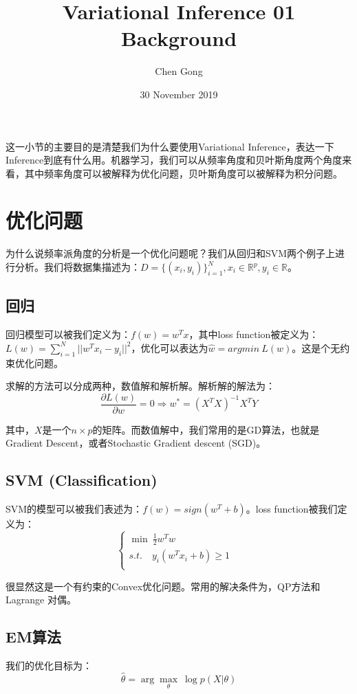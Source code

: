 \documentclass[a4paper]{article}
\title{Variational Inference 01 Background}
\author{Chen Gong}
\date{30 November 2019}
\begin{document}
\maketitle

这一小节的主要目的是清楚我们为什么要使用Variational Inference，表达一下Inference到底有什么用。机器学习，我们可以从频率角度和贝叶斯角度两个角度来看，其中频率角度可以被解释为优化问题，贝叶斯角度可以被解释为积分问题。

\section{优化问题}
为什么说频率派角度的分析是一个优化问题呢？我们从回归和SVM两个例子上进行分析。我们将数据集描述为：$D = \{ (x_i,y_i) \}_{i=1}^N,x_i \in \mathbb{R}^p,y_i \in \mathbb{R}$。
\subsection{回归}
回归模型可以被我们定义为：$f(w) = w^Tx$，其中loss function被定义为：$L(w) = \sum_{i=1}^N || w^Tx_i - y_i ||^2$，优化可以表达为$\hat{w} = argmin\ L(w)$。这是个无约束优化问题。

求解的方法可以分成两种，数值解和解析解。解析解的解法为：
\begin{equation}
    \frac{\partial L(w)}{\partial w} = 0 \Rightarrow w^{\ast} = (X^TX)^{-1}X^TY
\end{equation}

其中，$X$是一个$n\times p$的矩阵。而数值解中，我们常用的是GD算法，也就是Gradient Descent，或者Stochastic Gradient descent (SGD)。

\subsection{SVM (Classification)}
SVM的模型可以被我们表述为：$f(w) = sign(w^T+b)$。loss function被我们定义为：
\begin{equation}
    \left\{
    \begin{array}{ll}
        \min\ \frac{1}{2}w^Tw & \\
        s.t. \quad y_i(w^Tx_i + b) \geq 1 & \\
    \end{array}
    \right.
\end{equation}

很显然这是一个有约束的Convex优化问题。常用的解决条件为，QP方法和Lagrange 对偶。

\subsection{EM算法}
我们的优化目标为：
\begin{equation}
    \hat{\theta} = \arg\max_{\theta}\ \log p(X|\theta)
\end{equation}
\end{document}
